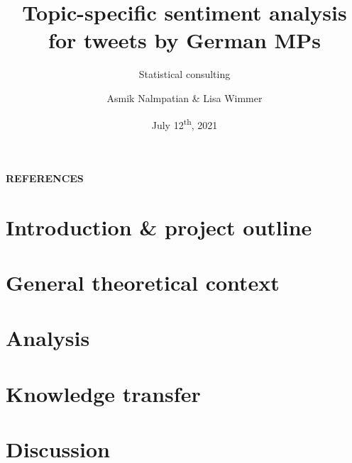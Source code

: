 \documentclass[11pt, t, aspectratio = 1610]{beamer}
\title[Consulting \LaTeX\ Beamer theme]{Topic-specific sentiment analysis for 
tweets by German MPs}
\subtitle{Statistical consulting}
\author{Asmik Nalmpatian \& Lisa Wimmer}
\date{July 12\textsuperscript{th}, 2021}
\begin{document}
{


  
  
  \begin{frame}
    \titlepage
  \end{frame}
  
}	


\begin{frame}[noframenumbering]{}

\vspace{1.5em}
\Large{\textbf{REFERENCES}}

\vfill
\vfill

\tableofcontents

\end{frame}


\section{Introduction \& project outline}
\label{intro}


\section{General theoretical context}
\label{theory}


\section{Analysis}
\label{analysis}


\section{Knowledge transfer}
\label{transfer}


\section{Discussion}
\label{discussion}

\end{document}

